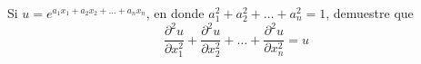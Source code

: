 \item Si $u = e^{a_1 x_1 + a_2 x_2 + \dots + a_n x_n}$, en donde $a_1^2 + a_2^2 + \dots + a_n^2 = 1$, demuestre que
\[ \frac{\partial^2 u}{\partial x_1^2} + \frac{\partial^2 u}{\partial x_2^2} + \dots + \frac{\partial^2 u}{\partial x_n^2} = u \]
